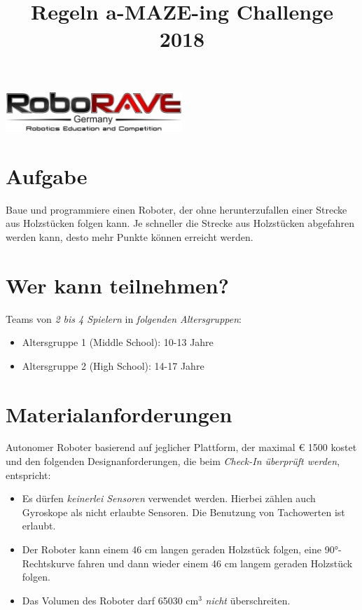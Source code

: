 \documentclass[a4paper,12pt]{article}
\begin{document}
\title{Regeln a-MAZE-ing Challenge 2018}
\makeatletter
\let\inserttitle\@title
\makeatother

 \begin{center}
\includegraphics[width=0.5\textwidth]{logo.png}

\huge                      %
\bfseries                   %
\inserttitle
  \end{center}
\section{Aufgabe}
Baue und programmiere einen Roboter, der ohne herunterzufallen einer Strecke aus Holzstücken folgen
kann. Je schneller die Strecke aus Holzstücken abgefahren werden kann, desto mehr Punkte können erreicht
werden.
\section{Wer kann teilnehmen?}
Teams von \emph{2 bis 4 Spielern} in \emph{folgenden Altersgruppen}:
\begin{itemize}
	\item Altersgruppe 1 (Middle School): 10-13 Jahre
	\item Altersgruppe 2 (High School): 14-17 Jahre
\end{itemize}
\section{Materialanforderungen}
Autonomer Roboter basierend auf jeglicher Plattform, der maximal  \euro{ 1500} kostet und den folgenden
Designanforderungen, die beim \emph{Check-In überprüft werden}, entspricht:
\begin{itemize}
\item Es dürfen \emph{keinerlei Sensoren} verwendet werden. Hierbei zählen auch Gyroskope als nicht erlaubte Sensoren. Die Benutzung von Tachowerten ist erlaubt.
\item Der Roboter kann einem 46 cm langen geraden Holzstück folgen, eine 90°-Rechtskurve fahren und dann wieder
einem 46 cm langem geraden Holzstück folgen.
\item Das Volumen des Roboter darf 65030 cm$^{3}$ \emph{nicht} überschreiten.
\end{itemize}
\end{document}
